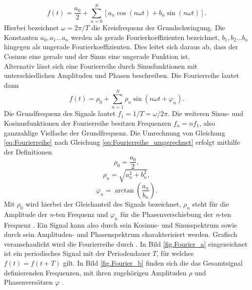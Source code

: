\begin{equation}
	\label{eq:Fourierreihe}
	f(t) = \dfrac{a_0}{2} + \sum_{n=0}^N[a_n \cos(n \omega t) + b_n \sin(n \omega t)].
\end{equation}
Hierbei bezeichnet $\omega = 2 \pi / T$ die Kreisfrequenz der Grundschwingung. Die Konstanten $a_0,a_1 \dots a_n$ werden als gerade Fourierkoeffizienten bezeichnet, $b_1, b_2 \dots b_n$ hingegen als ungerade Fourierkoeffizienten. Dies leitet sich daraus ab, dass der Cosinus eine gerade und der Sinus eine ungerade Funktion ist. \\
Alternativ lässt sich eine Fourierreihe durch Sinusfunktionen mit unterschiedlichen Amplituden und Phasen beschreiben. Die Fourierreihe lautet dann
\begin{equation}
	\label{eq:Fourierreihe_umgerechnet}
	f(t) = \rho_0 + \sum_{n=1}^{N} \rho_n \sin(n \omega t + \varphi_n).
\end{equation}
Die Grundfrequenz des Signals lautet $f_1 = 1/ T = \omega / 2 \pi$. Die weiteren Sinus- und Kosinusfunktionen der Fourierreihe besitzen Frequenzen $f_n = nf_1$, also ganzzahlige Vielfache der Grundfrequenz. Die Umrechnung von Gleichung \ref{eq:Fourierreihe} nach Gleichung \ref{eq:Fourierreihe_umgerechnet} erfolgt mithilfe der Definitionen
\begin{equation}
	\label{eq:rho_0} 
	\rho_0 = \frac{a_0}{2} ,
\end{equation}
\begin{equation}
	\label{eq:rho_n}
	\rho_n = \sqrt{a_n^2 + b_n^2} ,
\end{equation}
\begin{equation}
	\label{eq:phi_n}
	\varphi_n = \arctan(\frac{a_n}{b_n}) .
\end{equation}
Mit $\rho_0$ wird hierbei der Gleichanteil des Signals bezeichnet, $\rho_n$ steht für die Amplitude der \textit{n}-ten Frequenz und $\varphi_n$ für die Phasenverschiebung der \textit{n}-ten Frequenz \cite{Eichler.2006}. Ein Signal kann also durch sein Kosinus- und Sinusspektrum sowie durch sein Amplituden- und Phasenspektrum charakterisiert werden. 
Grafisch veranschaulicht wird die Fourierreihe durch . In Bild \ref{fig.Fourier_a} eingezeichnet ist ein periodisches Signal mit der Periodendauer $T$, für welches $f(t) = f(t + T)$ gilt. In Bild \ref{fig.Fourier_b} finden sich die das Gesamtsignal definierenden Frequenzen, mit ihren zugehörigen Amplituden $\rho$ und Phasenversätzen $\varphi$ \cite{Eichler.2006}.
